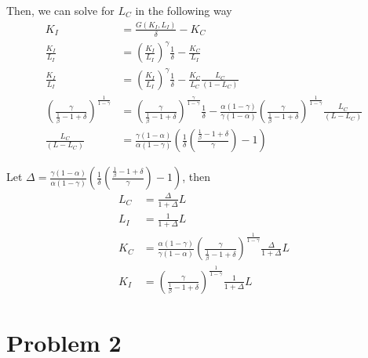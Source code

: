 \documentclass[12pt]{article}
\theoremstyle{definition}
\begin{document}
\begin{enumerate}[1.]
	Then, we can solve for $L_C$ in the following way
	\begin{align*}
	K_I & =\frac{G(K_I,L_I)}{\delta} -K_C \\
	\frac{K_I}{L_I} & = \left( \frac{K_I}{L_I}\right)^\gamma  \frac{1}{\delta} -\frac{K_C}{L_I} \\
	\frac{K_I}{L_I} & = \left( \frac{K_I}{L_I}\right)^\gamma  \frac{1}{\delta} -\frac{K_C}{L_C}\frac{L_C}{(1-L_C)} \\
	\left(\frac{\gamma}{\frac{1}{\beta}-1+\delta} \right)^{\frac{1}{1-\gamma}} & = \left(\frac{\gamma}{\frac{1}{\beta}-1+\delta} \right)^{\frac{\gamma}{1-\gamma}}  \frac{1}{\delta} -\frac{\alpha(1-\gamma)}{\gamma(1-\alpha)} \left(\frac{\gamma}{\frac{1}{\beta}-1+\delta} \right)^{\frac{1}{1-\gamma}}\frac{L_C}{(L-L_C)} \\
	 \frac{L_C}{(L-L_C)} & =\frac{\gamma(1-\alpha)}{\alpha(1-\gamma)}\left( \frac{1}{\delta}\left(\frac{\frac{1}{\beta}-1+\delta}{\gamma} \right)-1\right)
	\end{align*}
	
	Let $ \Delta =\frac{\gamma(1-\alpha)}{\alpha(1-\gamma)}\left( \frac{1}{\delta}\left(\frac{\frac{1}{\beta}-1+\delta}{\gamma} \right)-1\right) $, then
	\begin{align*}
		L_C &= \frac{\Delta}{1+\Delta}L\\
		L_I &= \frac{1}{1+\Delta}L\\
		K_C &=  \frac{\alpha(1-\gamma)}{\gamma(1-\alpha)} \left(\frac{\gamma}{\frac{1}{\beta}-1+\delta} \right)^{\frac{1}{1-\gamma}} \frac{\Delta}{1+\Delta}L\\
		K_I &=  \left(\frac{\gamma}{\frac{1}{\beta}-1+\delta} \right)^{\frac{1}{1-\gamma}} \frac{1}{1+\Delta}L
	\end{align*}
	
	
\end{enumerate}

\section*{Problem 2}
\end{document}
